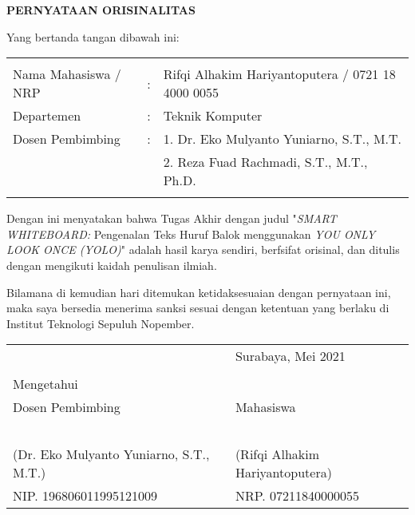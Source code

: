 \begin{center}
  \large
  \textbf{PERNYATAAN ORISINALITAS}
\end{center}

\thispagestyle{empty}

\vspace{2ex}


\noindent Yang bertanda tangan dibawah ini:

\noindent\begin{tabularx}{\textwidth}{X l l}
  & & \\
  Nama Mahasiswa / NRP &: & Rifqi Alhakim Hariyantoputera / 0721 18 4000 0055 \\
  Departemen &: & Teknik Komputer \\
  Dosen Pembimbing &: & 1. Dr. Eko Mulyanto Yuniarno, S.T., M.T. \\
  & & 2. Reza Fuad Rachmadi, S.T., M.T., Ph.D. \\
  & & \\
\end{tabularx}

Dengan ini menyatakan bahwa Tugas Akhir dengan judul "\emph{SMART WHITEBOARD:} Pengenalan Teks Huruf Balok menggunakan \emph{YOU ONLY LOOK ONCE (YOLO)}" adalah hasil karya sendiri, berfsifat orisinal, dan ditulis dengan mengikuti kaidah penulisan ilmiah.

Bilamana di kemudian hari ditemukan ketidaksesuaian dengan pernyataan ini, maka saya bersedia menerima sanksi sesuai dengan ketentuan yang berlaku di Institut Teknologi Sepuluh Nopember.

\vspace{8ex}

\noindent\begin{tabularx}{\textwidth}{X l}
  & Surabaya, Mei 2021\\
  & \\
  Mengetahui & \\
  Dosen Pembimbing & Mahasiswa\\
  & \\
  & \\
  & \\
  & \\
  & \\
  (Dr. Eko Mulyanto Yuniarno, S.T., M.T.) & (Rifqi Alhakim Hariyantoputera) \\
  NIP. 196806011995121009 & NRP. 07211840000055\\
\end{tabularx}